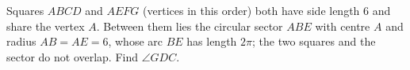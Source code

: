 Squares $ABCD$ and $AEFG$ (vertices in this order) both have side length $6$ and share the vertex $A$. Between them lies the circular sector $ABE$ with centre $A$ and radius $AB=AE=6$, whose arc $BE$ has length $2\pi$; the two squares and the sector do not overlap. Find $\angle GDC$.

